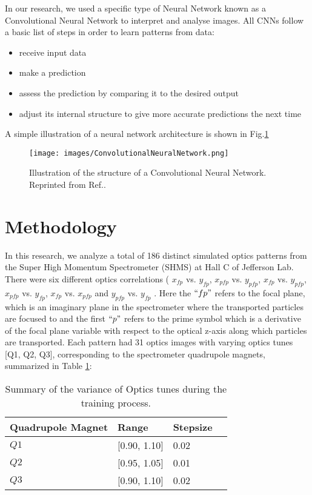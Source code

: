 \documentclass[conference]{IEEEtran}
\begin{document}
In our research, we used a specific type of Neural Network known as a Convolutional Neural Network to interpret and analyse images. All CNNs follow a basic list of steps in order to learn patterns from data:
\begin{itemize}
\item receive input data
\item make a prediction
\item assess the prediction by comparing it to the desired output
\item adjust its internal structure to give more accurate predictions the next time
\end{itemize}

A simple illustration of a neural network architecture is shown in Fig.\ref{fig:CNN_Image} 
\begin{figure}[h]
 \centering
  \texttt{[image: images/ConvolutionalNeuralNetwork.png]}
  \caption{Illustration of the structure of a Convolutional Neural Network. 
\\ \centering Reprinted from Ref.\cite{CNN_Image}.}
  \label{fig:CNN_Image}
\end{figure}



\section{Methodology}
In this research, we analyze a total of 186 distinct simulated optics patterns from the Super High Momentum Spectrometer (SHMS) at Hall C of Jefferson Lab.
There were six different optics correlations ( $x_{fp}$ vs. $y_{fp}$,  $x_{pfp}$ vs. $y_{pfp}$, $x_{fp}$ vs. $y_{pfp}$,  $x_{pfp}$ vs. $y_{fp}$, $x_{fp}$ vs. $x_{pfp}$ and  $y_{pfp}$ vs. $y_{fp}$ . Here the $``fp"$ refers to the focal plane, which is an imaginary plane in the spectrometer where the transported particles are focused to and the first $``p"$ refers to the prime symbol which is a derivative of the focal plane variable with respect to the optical z-axis along which particles are transported. Each pattern had 31 optics images with varying optics tunes [Q1, Q2, Q3], corresponding to the spectrometer quadrupole magnets, summarized in Table \ref{tab:tune_stpSize}:

\begin{table}[ht!]
	\begin{center}
		\begin{tabular}{llll} %
                  \hline
                  Quadrupole Magnet & Range & Stepsize \\
                  \hline\hline
	          $Q1$ & [0.90, 1.10] & 0.02  \\
                  $Q2$ & [0.95, 1.05] & 0.01  \\
                  $Q3$ & [0.90, 1.10] & 0.02  \\                       
                  \hline 
		\end{tabular}
	\end{center}
	\caption{Summary of the variance of Optics tunes during the training process.}
	\label{tab:tune_stpSize}
\end{table}
\end{document}
